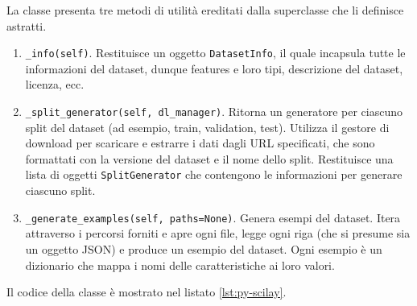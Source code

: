\documentclass[12pt,a4paper,twoside,openright]{book}
\begin{document}
La classe presenta tre metodi di utilità ereditati dalla superclasse che li definisce astratti. 
\begin{enumerate}
    \item \texttt{\_info(self)}. Restituisce un oggetto \texttt{DatasetInfo}, il quale incapsula tutte le informazioni del dataset, dunque features e loro tipi, descrizione del dataset, licenza, ecc.
    \item \texttt{\_split\_generator(self, dl\_manager)}. Ritorna un generatore per ciascuno split del dataset (ad esempio, train, validation, test). Utilizza il gestore di download per scaricare e estrarre i dati dagli URL specificati, che sono formattati con la versione del dataset e il nome dello split. Restituisce una lista di oggetti \texttt{SplitGenerator} che contengono le informazioni per generare ciascuno split.
    \item \texttt{\_generate\_examples(self, paths=None)}. Genera esempi del dataset. Itera attraverso i percorsi forniti e apre ogni file, legge ogni riga (che si presume sia un oggetto JSON) e produce un esempio del dataset. Ogni esempio è un dizionario che mappa i nomi delle caratteristiche ai loro valori.
\end{enumerate}

Il codice della classe è mostrato nel listato \ref{lst:py-scilay}.
\end{document}
